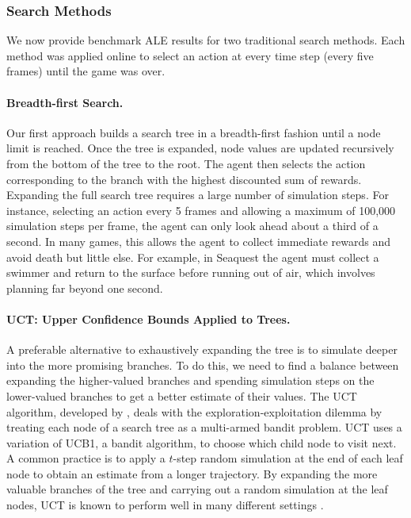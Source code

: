 \documentclass[twoside,11pt]{article}
\newcommand{\gamename}[1]{{\sc #1}}
\begin{document}
\subsubsection{Search Methods}
\label{sec:planning:methods}

We now provide benchmark ALE results for two traditional search methods.
Each method was applied online to select an action at every time step (every five frames) until the game was over.

\paragraph{Breadth-first Search.}
\label{sec:agents:search:fulltree}
Our first approach builds a search tree in a breadth-first fashion until a node limit is reached.
Once the tree is expanded, node values are updated recursively from the bottom of the tree to the root. The agent then selects the action corresponding to the branch with the highest discounted sum of rewards. Expanding the full search tree requires a large number of simulation steps. 
For instance, selecting an action every 5 frames and allowing a maximum of 100,000 simulation steps per frame, the agent can only look ahead about a third of a second. 
In many games, this allows the agent to collect immediate rewards and avoid death but little else. For example, in \gamename{Seaquest} the agent must collect a swimmer and return to the surface before running out of air, which involves planning far beyond one second.

\paragraph{UCT: Upper Confidence Bounds Applied to Trees.}
\label{sec:agents:search:uct}
A preferable alternative to exhaustively expanding the tree is to simulate deeper into the more promising branches. To do this, we need to find a balance between expanding the higher-valued branches and spending simulation steps on the lower-valued branches to get a better estimate of their values. 
The UCT algorithm, developed by , deals with the exploration-exploitation dilemma by treating each node of a search tree as a multi-armed bandit problem. UCT uses a variation of UCB1, a bandit algorithm, to choose which child node to visit next. A common practice is to apply a $t$-step random simulation at the end of each leaf node to obtain an estimate from a longer trajectory. By expanding the more valuable branches of the tree and carrying out a random simulation at the leaf nodes, UCT is known to perform well in many different settings .
 
\end{document}
